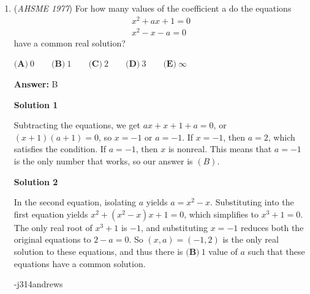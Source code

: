 \begin{enumerate}
 \textbf{Answer: }E



\textbf{Solution}

The path will either start on the left side, start on the right side, or go down the middle. Say it starts on the left side. Instead of counting it starting from the $C$, let's start at the T and work backwards. Starting at the $T$, there are $2$ options to choose the $S$. Then, there are $2$ options to chose the $E$, $T$, $N$, $O$, and $C$, for a total of $2^6=64$ possibilities. But we need to subtract the case where it does down the middle, which makes it $63$ possibilities. The right side also has $63$ possibilities by symmetry. There is $1$ way for it to go down the middle, for a total of $63+63+1=127$ paths, so the answer is $\textbf{(E) }\text{none of these}$.

 


	\item (\textit{AHSME 1977}) For how many values of the coefficient a do the equations 
 \begin{align*}x^2+ax+1=0 \\ x^2-x-a=0\end{align*}
 have a common real solution?


 $\textbf{(A)}\ 0 \qquad \textbf{(B)}\ 1 \qquad \textbf{(C)}\ 2 \qquad \textbf{(D)}\ 3 \qquad \textbf{(E)}\ \infty$

 \textbf{Answer: }B



\textbf{Solution 1}

Subtracting the equations, we get $ax+x+1+a=0$, or $(x+1)(a+1)=0$, so $x=-1$ or $a=-1$. If $x=-1$, then $a=2$, which satisfies the condition. If $a=-1$, then $x$ is nonreal. This means that $a=-1$ is the only number that works, so our answer is $(B)$.

 



\textbf{Solution 2}

In the second equation, isolating $a$ yields $a = x^2 - x$.  Substituting into the first equation yields $x^2+(x^2-x)x+1=0$, which simplifies to $x^3+1=0$.  The only real root of $x^3+1$ is $-1$, and substituting $x=-1$ reduces both the original equations to $2-a=0$.  So $(x,a)=(-1,2)$ is the only real solution to these equations, and thus there is $\boxed{\textbf{(B)}\ 1}$ value of $a$ such that these equations have a common solution.

 -j314andrews

 



\end{enumerate}
